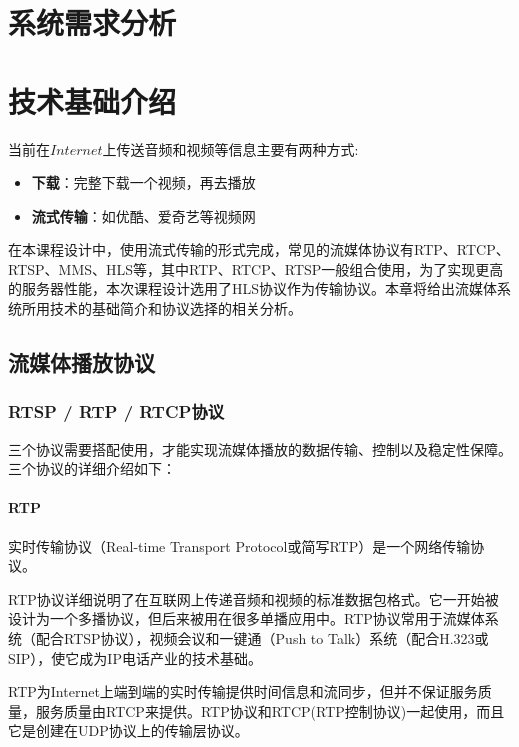 \documentclass[bachelor]{thesis-uestc}
\begin{document}
\chapter{系统需求分析}


\chapter{技术基础介绍}

当前在$Internet$上传送音频和视频等信息主要有两种方式:

\begin{itemize}
	\item \textbf{下载}：完整下载一个视频，再去播放
	\item \textbf{流式传输}：如优酷、爱奇艺等视频网
\end{itemize}

在本课程设计中，使用流式传输的形式完成，常见的流媒体协议有RTP、RTCP、RTSP、MMS、HLS等，其中RTP、RTCP、RTSP一般组合使用，为了实现更高的服务器性能，本次课程设计选用了HLS协议作为传输协议。本章将给出流媒体系统所用技术的基础简介和协议选择的相关分析。

\section{流媒体播放协议}

\subsection{RTSP / RTP / RTCP协议}
三个协议需要搭配使用，才能实现流媒体播放的数据传输、控制以及稳定性保障。三个协议的详细介绍如下：

\subsubsection{RTP}


\par 实时传输协议（Real-time Transport Protocol或简写RTP）是一个网络传输协议。

\par RTP协议详细说明了在互联网上传递音频和视频的标准数据包格式。它一开始被设计为一个多播协议，但后来被用在很多单播应用中。RTP协议常用于流媒体系统（配合RTSP协议），视频会议和一键通（Push to Talk）系统（配合H.323或SIP），使它成为IP电话产业的技术基础。

\par RTP为Internet上端到端的实时传输提供时间信息和流同步，但并不保证服务质量，服务质量由RTCP来提供。RTP协议和RTCP(RTP控制协议)一起使用，而且它是创建在UDP协议上的传输层协议。
\end{document}

